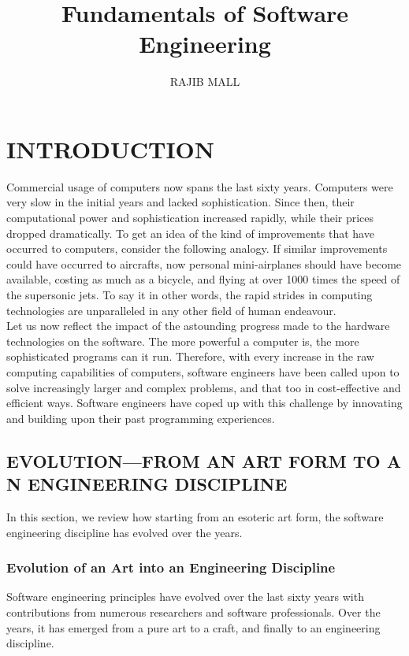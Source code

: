 \documentclass[12pt]{article}
\title{Fundamentals of Software Engineering}
\author{RAJIB MALL}
\date{}
\begin{document}
	\maketitle
	\pagebreak
	
	\tableofcontents
	\pagebreak
	
\section{INTRODUCTION}
Commercial usage of computers now spans the last sixty years.
Computers were very slow in the initial years and lacked sophistication.
Since then, their computational power and sophistication increased
rapidly, while their prices dropped dramatically. To get an idea of the
kind of improvements that have occurred to computers, consider the
following analogy. If similar improvements could have occurred to
aircrafts, now personal mini-airplanes should have become available,
costing as much as a bicycle, and flying at over 1000 times the speed of
the supersonic jets. To say it in other words, the rapid strides in
computing technologies are unparalleled in any other field of human
endeavour.\\

Let us now reflect the impact of the astounding progress made to the
hardware technologies on the software. The more powerful a computer is,
the more sophisticated programs can it run. Therefore, with every increase in
the raw computing capabilities of computers, software engineers have been
called upon to solve increasingly larger and complex problems, and that too
in cost-effective and efficient ways. Software engineers have coped up with
this challenge by innovating and building upon their past programming
experiences.
\subsection{EVOLUTION—FROM AN ART FORM TO A N ENGINEERING
DISCIPLINE}
In this section, we review how starting from an esoteric art form, the
software engineering discipline has evolved over the years.
\subsubsection{Evolution of an Art into an Engineering Discipline}
Software engineering principles have evolved over the last sixty years
with contributions from numerous researchers and software
professionals. Over the years, it has emerged from a pure art to a craft,
and finally to an engineering discipline.
\end{document}
